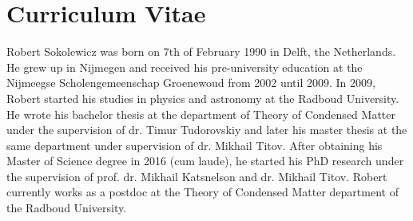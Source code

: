 \manualmark
{}%
%
%
\chapter*{Curriculum Vitae}%

Robert Sokolewicz was born on 7th of February 1990 in Delft, the Netherlands. He grew up in Nijmegen and received his pre-university education at the Nijmeegse Scholengemeenschap Groenewoud from 2002 until 2009. In 2009, Robert started his studies in physics and astronomy at the Radboud University. He wrote his bachelor thesis at the department of Theory of Condensed Matter under the supervision of dr. Timur Tudorovskiy and later his master thesis at the same department under supervision of dr. Mikhail Titov. After obtaining his Master of Science degree in 2016 (cum laude), he started his PhD research under the supervision of prof. dr. Mikhail Katsnelson and dr. Mikhail Titov. Robert currently works as a postdoc at the Theory of Condensed Matter department of
the Radboud University.